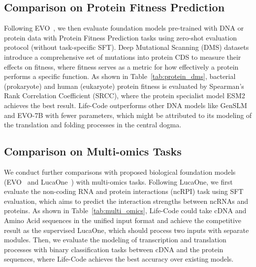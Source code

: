 

\subsection{Comparison on Protein Fitness Prediction}
\label{sec:protein_comparison}
Following EVO~\citep{nguyen2024evo}, we then evaluate foundation models pre-trained with DNA or protein data with Protein Fitness Prediction tasks using zero-shot evaluation protocol (without task-specific SFT). Deep Mutational Scanning (DMS) datasets \citep{icml2022Tranception, nguyen2024evo} introduce a comprehensive set of mutations into protein CDS to measure their effects on fitness, where fitness serves as a metric for how effectively a protein performs a specific function. As shown in Table~\ref{tab:protein_dms}, bacterial (prokaryote) and human (eukaryote) protein fitness is evaluated by Spearman's Rank Correlation Coefficient (SRCC), where the protein specialist model ESM2 achieves the best result. Life-Code outperforms other DNA models like GenSLM~\citep{ijhpca2023genslms} and EVO-7B with fewer parameters, which might be attributed to its modeling of the translation and folding processes in the central dogma.




\subsection{Comparison on Multi-omics Tasks}
\label{sec:multiomics_comparison}
We conduct further comparisons with proposed biological foundation models (EVO~\citep{nguyen2024evo} and LucaOne~\citep{he2024lucaone}) with multi-omics tasks. Following LucaOne, we first evaluate the non-coding RNA and protein interactions (ncRPI) task using SFT evaluation, which aims to predict the interaction strengths between ncRNAs and proteins. As shown in Table~\ref{tab:multi_omics}, Life-Code could take cDNA and Amino Acid sequences in the unified input format and achieve the competitive result as the supervised LucaOne, which should process two inputs with separate modules. Then, we evaluate the modeling of transcription and translation processes with binary classification tasks between cDNA and the protein sequences, where Life-Code achieves the best accuracy over existing models.





